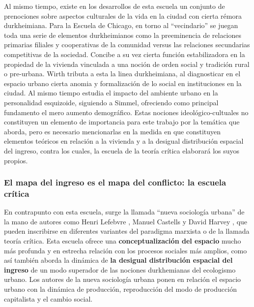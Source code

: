 Al mismo tiempo, existe en los desarrollos de esta escuela un conjunto de prenociones sobre aspectos culturales de la vida en la ciudad con cierta rémora durkheimiana. Para la Escuela de Chicago, en torno al “vecindario” se juegan toda una serie de elementos durkheimianos como la preeminencia de relaciones primarias filiales y cooperativas de la comunidad versus las relaciones secundarias competitivas de la sociedad. Concibe a su vez cierta función estabilizadora en la propiedad de la vivienda vinculada a una noción de orden social y tradición rural o pre-urbana. Wirth tributa a esta la linea durkheimiana, al diagnosticar en el espacio urbano cierta anomia y formalización de lo social en instituciones en la ciudad. Al mismo tiempo estudia el impacto del ambiente urbano en la personalidad esquizoide, siguiendo a Simmel, ofreciendo como principal fundamento el mero aumento demográfico. Estas nociones ideológico-cultuales no constituyen un elemento de importancia para este trabajo por la temática que aborda, pero es necesario mencionarlas en la medida en que constituyen elementos teóricos en relación a la vivienda y a la desigual distribución espacial del ingreso, contra los cuales, la escuela de la teoría crítica elaborará los suyos propios. 

\subsubsection{El mapa del ingreso es el mapa del conflicto: la escuela crítica}

En contrapunto con esta escuela, surge la llamada “nueva sociología urbana” de la mano de autores como Henri Lefebvre \citeyear{lefebvre}, Manuel Castells \citeyear{castells} y David Harvey \citeyear{harvey}, que pueden inscribirse en diferentes variantes del paradigma marxista o de la llamada teoría crítica. Esta escuela ofrece una \textbf{conceptualización del espacio} mucho más profunda y en estrecha relación con los procesos sociales más amplios, como así también aborda la dinámica de \textbf{la desigual distribución espacial del ingreso} de un modo superador de las nociones durkhemianas del ecologismo urbano. Los autores de la nueva sociología urbana ponen en relación el espacio urbano con la dinámica de producción, reproducción del modo de producción capitalista y el cambio social.

